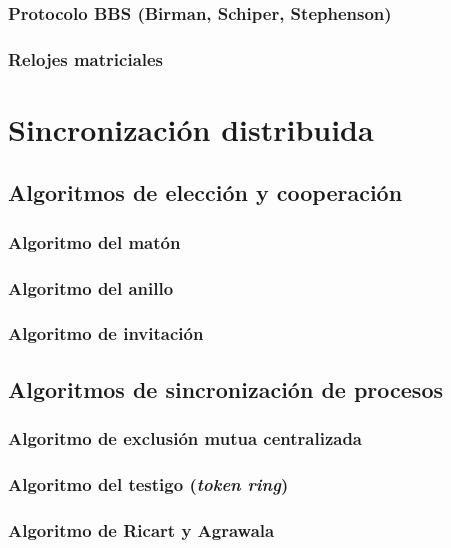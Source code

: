 \documentclass[a4paper, 11pt, titlepage]{article}
\begin{document}
        \subsubsection{Protocolo BBS (Birman, Schiper, Stephenson)}

        \subsubsection{Relojes matriciales}

\section{Sincronización distribuida}

    \subsection{Algoritmos de elección y cooperación}

        \subsubsection{Algoritmo del matón}

        \subsubsection{Algoritmo del anillo}

        \subsubsection{Algoritmo de invitación}

    \subsection{Algoritmos de sincronización de procesos}

        \subsubsection{Algoritmo de exclusión mutua centralizada}

        \subsubsection{Algoritmo del testigo (\textit{token ring})}

        \subsubsection{Algoritmo de Ricart y Agrawala}
\end{document}
